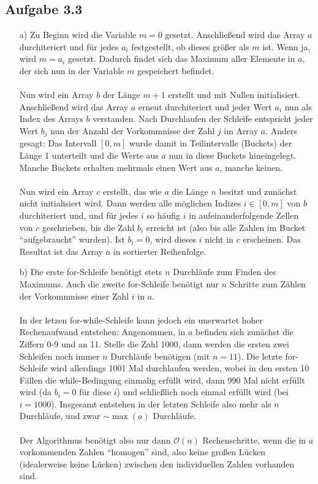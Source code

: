 \documentclass{article}
\begin{document}
    \subsection*{Aufgabe 3.3}
    \begin{enumerate}
        \item[a)] Zu Beginn wird die Variable $m=0$ gesetzt. Anschließend wird das Array $a$ durchiteriert und für jedes $a_i$ festgestellt, ob dieses größer als $m$ ist. Wenn ja, wird $m=a_i$ gesetzt. Dadurch findet sich das Maximum aller Elemente in $a$, der sich nun in der Variable $m$ gespeichert befindet. \\\\
        Nun wird ein Array $b$ der Länge $m+1$ erstellt und mit Nullen initialisiert. Anschließend wird das Array $a$ erneut durchiteriert und jeder Wert $a_i$ nun als Index des Arrays $b$ verstanden. Nach Durchlaufen der Schleife entspricht jeder Wert $b_j$ nun der Anzahl der Vorkommnisse der Zahl $j$ im Array $a$. Anders gesagt: Das Intervall $[0, m]$ wurde damit in Teilintervalle (Buckets) der Länge 1 unterteilt und die Werte aus $a$ nun in diese Buckets hineingelegt. Manche Buckets erhalten mehrmals einen Wert aus $a$, manche keinen. \\\\
        Nun wird ein Array $c$ erstellt, das wie $a$ die Länge $n$ besitzt und zunächst nicht initialisiert wird. Dann werden alle möglichen Indizes $i \in [0,m]$ von $b$ durchiteriert und, und für jedes $i$ so häufig $i$ in aufeinanderfolgende Zellen von $c$ geschrieben, bis die Zahl $b_i$ erreicht ist (also bis alle Zahlen im Bucket "`aufgebraucht"' wurden). Ist $b_i=0$, wird dieses $i$ nicht in $c$ erscheinen. Das Resultat ist das Array $a$ in sortierter Reihenfolge. 
        \item[b)] Die erste for-Schleife benötigt stets $n$ Durchläufe zum Finden des Maximums. Auch die zweite for-Schleife benötigt nur $n$ Schritte zum Zählen der Vorkommnisse einer Zahl $i$ in $a$. \\\\
        In der letzen for-while-Schleife kann jedoch ein unerwartet hoher Rechenaufwand entstehen: Angenommen, in $a$ befinden sich zunächst die Ziffern 0-9 und an 11. Stelle die Zahl 1000, dann werden die ersten zwei Schleifen noch immer $n$ Durchläufe benötigen (mit $n=11$). Die letzte for-Schleife wird allerdings 1001 Mal durchlaufen werden, wobei in den ersten 10 Fällen die while-Bedingung einmalig erfüllt wird, dann 990 Mal nicht erfüllt wird (da $b_i=0$ für diese $i$) und schließlich noch einmal erfüllt wird (bei $i=1000$). Insgesamt entstehen in der letzten Schleife also mehr als $n$ Durchläufe, und zwar $\sim \max(a)$ Durchläufe. \\\\
        Der Algorithmus benötigt also nur dann $\mathcal{O}(n)$ Rechenschritte, wenn die in $a$ vorkommenden Zahlen "`homogen"' sind, also keine großen Lücken (idealerweise keine Lücken) zwischen den individuellen Zahlen vorhanden sind. 
    \end{enumerate}
\end{document}
